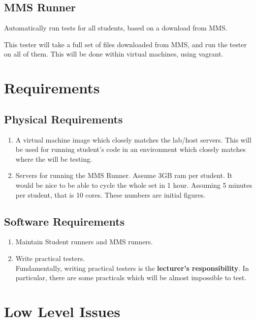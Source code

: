 \documentclass[11pt]{article}
\begin{document}
\subsection{MMS Runner}

Automatically run tests for all students, based on a download from MMS.

This tester will take a full set of files downloaded from MMS, and run the tester on all of them. This will be done within virtual machines, using vagrant.

\section{Requirements}

\subsection{Physical Requirements}

\begin{enumerate}
\item A virtual machine image which closely matches the lab/host servers. This will be used for running student's code in an environment which closely matches where the will be testing.
\item Servers for running the MMS Runner. Assume 3GB ram per student. It would be nice to be able to cycle the whole set in 1 hour. Assuming 5 minutes per student, that is 10 cores. These numbers are initial figures.
\end{enumerate}

\subsection{Software Requirements}

\begin{enumerate}
\item Maintain Student runners and MMS runners.
\item Write practical testers.\\
Fundamentally, writing practical testers is the \textbf{lecturer's responsibility}. In particular, there are some practicals which will be almost impossible to test.
\end{enumerate}

\section{Low Level Issues}
\end{document}
